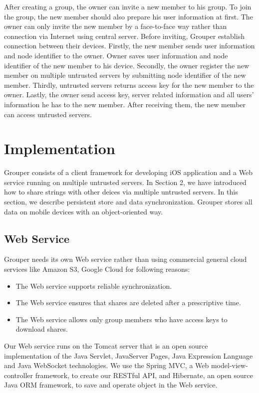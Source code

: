 \documentclass[twocolumn,10pt]{article}
\begin{document}
After creating a group, the owner can invite a new member to his group. To join the group, the new member should also prepare his user information at first. The owner can only invite the new member by a face-to-face way rather than connection via Internet using central server. Before inviting, Grouper establish connection between their devices. Firstly, the new member sends user information and node identifier to the owner. Owner saves user information and node identifier of the new member to his device. Secondly, the owner register the new member on multiple untrusted servers by submitting node identifier of the new member. Thirdly, untrusted servers returns access key for the new member to the owner. Lastly, the owner send access key, server related information and all users' information he has to the new member. After receiving them, the new member can access untrusted servers.

\section{Implementation}

Grouper consists of a client framework for developing iOS application and a Web service running on multiple untrusted servers. In Section 2, we have introduced how to share strings with other deices via multiple untrusted servers. In this section, we describe persistent store and data synchronization. Grouper stores all data on mobile devices with an object-oriented way.

\subsection{Web Service}
Grouper needs its own Web service rather than using commercial general cloud services like Amazon S3, Google Cloud for following reasons:

\begin{itemize}
	\setlength{\itemsep}{1pt}
	\setlength{\parskip}{0pt}
	\setlength{\parsep}{0pt}
	\item The Web service supports reliable synchronization.
	\item The Web service ensures that shares are deleted after a prescriptive time.
	\item The Web service allows only group members who have access keys to download shares.
\end{itemize}

Our Web service runs on the Tomcat server that is an open source implementation of the Java Servlet, JavaServer Pages, Java Expression Language and Java WebSocket technologies. We use the Spring MVC, a  Web model-view-controller framework, to create our RESTful API, and Hibernate, an open source Java ORM framework, to save and operate object in the Web service. 
\end{document}
